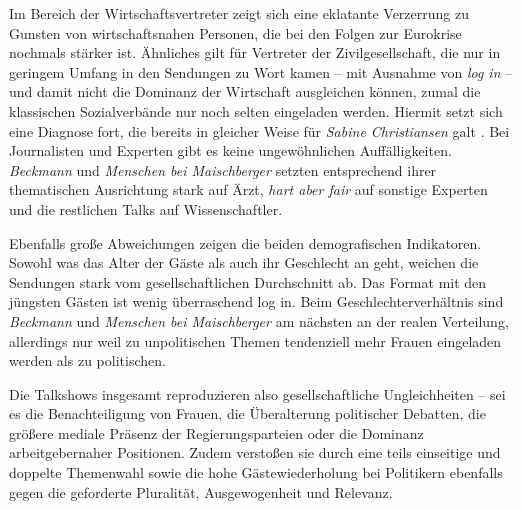 Im Bereich der Wirtschaftsvertreter zeigt sich eine eklatante Verzerrung zu Gunsten von wirtschaftsnahen Personen, die bei den Folgen zur Eurokrise nochmals stärker ist. Ähnliches gilt für Vertreter der Zivilgesellschaft, die nur in geringem Umfang in den Sendungen zu Wort kamen – mit Ausnahme von \textit{log in} – und damit nicht die Dominanz der Wirtschaft ausgleichen können, zumal die klassischen Sozialverbände nur noch selten eingeladen werden. Hiermit setzt sich eine Diagnose fort, die bereits in gleicher Weise für \textit{Sabine Christiansen} galt \parencite[7]{muellerSchaubuehneFuerEinflussreichen2006}. Bei Journalisten und Experten gibt es keine ungewöhnlichen Auffälligkeiten. \textit{Beckmann} und \textit{Menschen bei Maischberger} setzten entsprechend ihrer thematischen Ausrichtung stark auf Ärzt, \textit{hart aber fair} auf sonstige Experten und die restlichen Talks auf Wissenschaftler.

Ebenfalls große Abweichungen zeigen die beiden demografischen Indikatoren. Sowohl was das Alter der Gäste als auch ihr Geschlecht an geht, weichen die Sendungen stark vom gesellschaftlichen Durchschnitt ab. Das Format mit den jüngsten Gästen ist wenig überraschend log in. Beim Geschlechterverhältnis sind \textit{Beckmann} und \textit{Menschen bei Maischberger} am nächsten an der realen Verteilung, allerdings nur weil zu unpolitischen Themen tendenziell mehr Frauen eingeladen werden als zu politischen.

Die Talkshows insgesamt reproduzieren also gesellschaftliche Ungleichheiten – sei es die Benachteiligung von Frauen, die Überalterung politischer Debatten, die größere mediale Präsenz der Regierungsparteien oder die Dominanz arbeitgebernaher Positionen. Zudem verstoßen sie durch eine teils einseitige und doppelte Themenwahl sowie die hohe Gästewiederholung bei Politikern ebenfalls gegen die geforderte Pluralität, Ausgewogenheit und Relevanz.